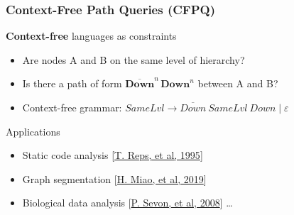 \documentclass[xcolor=table,aspectratio=169]{beamer}
\begin{document}
\begin{frame}[fragile] \frametitle{Context-Free Path Queries (CFPQ)}
      \begin{minipage}[m]{0.45\linewidth}
  \end{minipage}\hfill
  \begin{minipage}[m]{0.5\linewidth}
  \textbf{Context-free} languages as constraints
  \begin{itemize}
        \item Are nodes A and B on the same level of hierarchy?
        \item Is there a path of form $\overline{\textbf{Down}}^n \, \textbf{Down}^n$ between A and B?
        \item Context-free grammar: $\textit{SameLvl} \to \overline{\textit{Down}} \ \textit{SameLvl} \ \textit{Down} \mid \varepsilon$
  \end{itemize}
  \pause

  \vspace{0.3cm}


  Applications
    \begin{itemize}
      \item Static code analysis [\href{https://dl.acm.org/doi/10.1145/199448.199462}{T. Reps, et al, 1995}]
      \item Graph segmentation [\href{https://dblp.org/rec/conf/icde/0001D19.html}{H. Miao, et al, 2019}]
      \item Biological data analysis [\href{https://pubmed.ncbi.nlm.nih.gov/20134073/}{P. Sevon, et al, 2008}] \ldots
    \end{itemize}

  \end{minipage}

  \end{frame}
\end{document}
